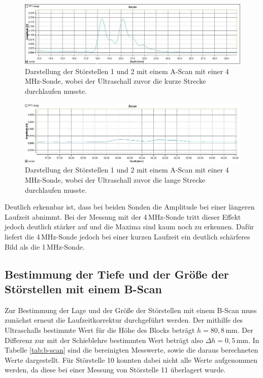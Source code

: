 \begin{figure}[H]
  \centering
  \includegraphics[width=\textwidth]{data/4mhzdoppelteFehlstellekurzelLaufzeitGedrehtwieinZeichnung.jpg}
  \caption{Darstellung der Störstellen 1 und 2 mit einem A-Scan mit einer 4\,MHz-Sonde, wobei der Ultraschall
  zuvor die kurze Strecke durchlaufen musste.}
  \label{fig:auflösung3}
\end{figure}

\begin{figure}[H]
  \centering
  \includegraphics[width=\textwidth]{data/4mhzdoppelteFehlstellelangeLaufzeit.jpg}
  \caption{Darstellung der Störstellen 1 und 2 mit einem A-Scan mit einer 4\,MHz-Sonde, wobei der Ultraschall
  zuvor die lange Strecke durchlaufen musste.}
  \label{fig:auflösung4}
\end{figure}

Deutlich erkennbar ist, dass bei beiden Sonden die Amplitude bei einer längeren
Laufzeit abnimmt. Bei der Messung mit der 4\,MHz-Sonde tritt dieser Effekt jedoch
deutlich stärker auf und die Maxima sind kaum noch zu erkennen. Dafür liefert die
4\,MHz-Sonde jedoch bei einer kurzen Laufzeit ein deutlich schärferes Bild als die
1\,MHz-Sonde.

\subsection{Bestimmung der Tiefe und der Größe der Störstellen mit einem B-Scan}
\label{subsec:B_scan_störstellen}

Zur Bestimmung der Lage und der Größe der Störstellen mit einem B-Scan muss zunächst
erneut die Laufzeitkorrektur durchgeführt werden. Der mithilfe des Ultraschalls bestimmte
Wert für die Höhe des Blocks beträgt $h=80{,}8\,$mm. Der Differenz zur mit der Schieblehre
bestimmten Wert beträgt also $\Delta h=0{,}5\,$mm. In Tabelle \ref{tab:b-scan}
sind die bereinigten Messwerte, sowie die daraus berechneten Werte dargestellt.
Für Störstelle 10 konnten dabei nicht alle Werte aufgenommen werden, da diese bei einer
Messung von Störstelle 11 überlagert wurde.

